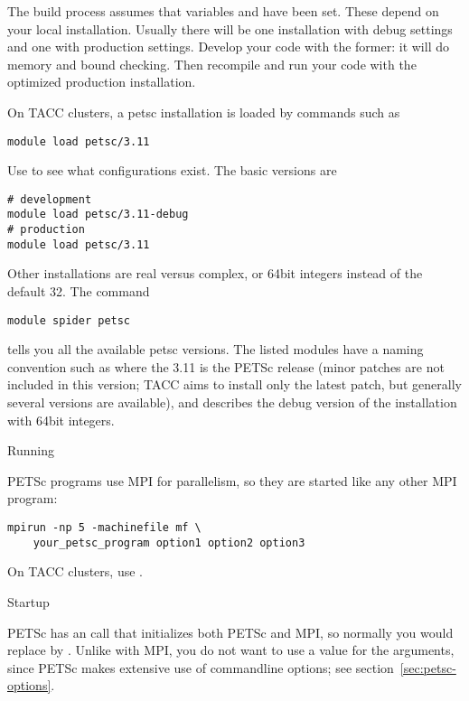 The build process assumes that variables  and
 have been set. These depend on your local
installation. Usually there will be one installation with debug
settings and one with production settings. Develop your code with the
former: it will do memory and bound checking. Then recompile and run
your code with the optimized production installation.

\begin{taccnote}
  On TACC clusters, a petsc installation is loaded by commands such as
\begin{verbatim}
module load petsc/3.11
\end{verbatim}
Use  to see what configurations exist. The basic
versions are
\begin{verbatim}
# development
module load petsc/3.11-debug
# production
module load petsc/3.11
\end{verbatim}
Other installations are real versus complex, or 64bit integers instead
of the default 32. The command 
\begin{verbatim}
module spider petsc
\end{verbatim}
tells you all the
available petsc versions. The listed modules have a naming convention
such as  where the 3.11 is the PETSc release (minor
patches are not included in this version; TACC aims to install only
the latest patch, but generally several versions are available), and
 describes the debug version of the installation with 64bit
integers.
\end{taccnote}

 {Running}

PETSc programs use MPI for parallelism, so they are started like any other
MPI program:
\begin{verbatim}
mpirun -np 5 -machinefile mf \
    your_petsc_program option1 option2 option3
\end{verbatim}
\begin{taccnote}
  On TACC clusters, use .
\end{taccnote}

 {Startup}
\label{sec:petscinit}

PETSc has an call that initializes both PETSc and MPI, so normally you
would replace \indexmpishow{MPI_Init} by
.
Unlike with MPI, you do not want to
use a  value for the  arguments, since PETSc
makes extensive use of commandline options; see
section~\ref{sec:petsc-options}.


